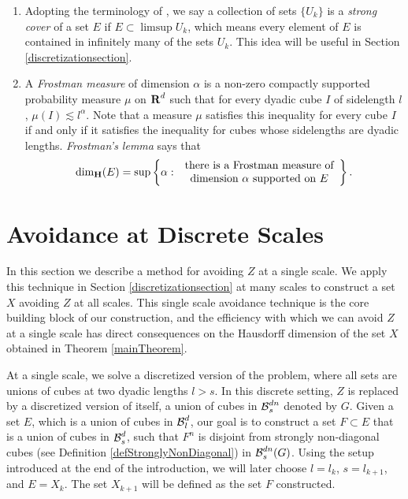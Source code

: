 \begin{enumerate}
	\item\label{defStrongCover} Adopting the terminology of \cite{KatzTao}, we say a collection of sets $\{ U_k \}$ is a {\it strong cover} of a set $E$ if $E \subset \limsup U_k$, which means every element of $E$ is contained in infinitely many of the sets $U_k$. This idea will be useful in Section \ref{discretizationsection}.  

	\item\label{defFrostmanItem} A {\it Frostman measure} of dimension $\alpha$ is a non-zero compactly supported probability measure $\mu$ on $\operatorname{\mathbf{R}}^d$ such that for every dyadic cube $I$ of sidelength $l$, $\mu(I) \lesssim l^\alpha$. Note that a measure $\mu$ satisfies this inequality for every cube $I$ if and only if it satisfies the inequality for cubes whose sidelengths are dyadic lengths. {\it Frostman's lemma} says that
	\[ \operatorname{\dim_{\mathbf{H}}}(E) = \sup \left\{ \alpha \operatorname{\colon}
		\begin{array}{c}
			\text{there is a Frostman measure of}\\
			\text{dimension $\alpha$ supported on $E$}
		\end{array} \right\}. \]
\end{enumerate}









\section{Avoidance at Discrete Scales}\label{discretesection}

In this section we describe a method for avoiding $Z$ at a single scale. We apply this technique in Section \ref{discretizationsection} at many scales to construct a set $X$ avoiding $Z$ at all scales. This single scale avoidance technique is the core building block of our construction, and the efficiency with which we can avoid $Z$ at a single scale has direct consequences on the Hausdorff dimension of the set $X$ obtained in Theorem \ref{mainTheorem}.

At a single scale, we solve a discretized version of the problem, where all sets are unions of cubes at two dyadic lengths $l > s$. In this discrete setting, $Z$ is replaced by a discretized version of itself, a union of cubes in $\operatorname{\mathcal{B}}^{dn}_s$ denoted by $G$. Given a set $E$, which is a union of cubes in $\operatorname{\mathcal{B}}_l^d$, our goal is to construct a set $F \subset E$ that is a union of cubes in $\operatorname{\mathcal{B}}_s^d$, such that $F^n$ is disjoint from strongly non-diagonal cubes (see Definition \ref{defStronglyNonDiagonal}) in $\operatorname{\mathcal{B}}^{dn}_s(G)$. Using the setup introduced at the end of the introduction, we will later choose $l = l_k$, $s = l_{k+1}$, and $E = X_k$. The set $X_{k+1}$ will be defined as the set $F$ constructed.

